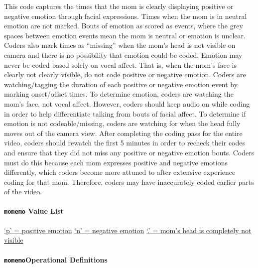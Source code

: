 \documentclass[
  12pt,
]{book}
\begin{document}
This code captures the times that the mom is clearly displaying positive or negative emotion through facial expressions. Times when the mom is in neutral emotion are not marked. Bouts of emotion as scored as events, where the grey spaces between emotion events mean the mom is neutral or emotion is unclear. Coders also mark times as ``missing'' when the mom's head is not visible on camera and there is no possibility that emotion could be coded. Emotion may never be coded based solely on vocal affect. That is, when the mom's face is clearly not clearly visible, do not code positive or negative emotion.
Coders are watching/tagging the duration of each positive or negative emotion event by marking onset/offset times. To determine emotion, coders are watching the mom's face, not vocal affect. However, coders should keep audio on while coding in order to help differentiate talking from bouts of facial affect. To determine if emotion is not codeable/missing, coders are watching for when the head fully moves out of the camera view.
After completing the coding pass for the entire video, coders should rewatch the first 5 minutes in order to recheck their codes and ensure that they did not miss any positive or negative emotion bouts. Coders must do this because each mom expresses positive and negative emotions differently, which coders become more attuned to after extensive experience coding for that mom. Therefore, coders may have inaccurately coded earlier parts of the video.

\hypertarget{mom_emo_value_list}{%
\paragraph*{\texorpdfstring{\texttt{momemo} Value List}{momemo Value List}}\label{mom_emo_value_list}}

\protect\hyperlink{mom_pos_emo}{`p' = positive emotion}
\protect\hyperlink{mom_neg_emo}{`n' = negative emotion}
\protect\hyperlink{mom_head_not_visible}{`.' = mom's head is completely not visible}

\hypertarget{momemooperational-definitions}{%
\paragraph*{\texorpdfstring{\texttt{momemo}Operational Definitions}{momemoOperational Definitions}}\label{momemooperational-definitions}}
\end{document}
